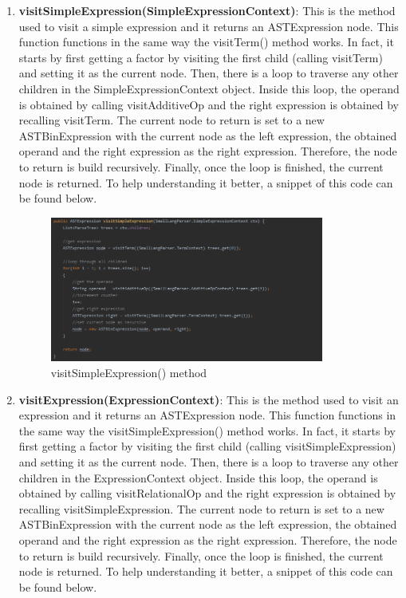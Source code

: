 \documentclass{article}
\begin{document}
\begin{enumerate}
					\item \textbf{visitSimpleExpression(SimpleExpressionContext)}:  This is the method used to visit a simple expression and it returns an ASTExpression node. This function functions in the same way the visitTerm() method works. In fact, it starts by first getting a factor by visiting the first child (calling visitTerm) and setting it as the current node. Then, there is a loop to traverse any other children in the SimpleExpressionContext object. Inside this loop, the operand is obtained by calling visitAdditiveOp and the right expression is obtained by recalling visitTerm. The current node to return is set to a new ASTBinExpression with the current node as the left expression, the obtained operand and the right expression as the right expression. Therefore, the node to return is build recursively. Finally, once the loop is finished, the current node is returned. To help understanding it better, a snippet of this code can be found below.
					
										\begin{figure}[H]
					\centering
			 			\includegraphics[width=0.85\textwidth]{transformerse.png}
			  			\caption{visitSimpleExpression() method}
			  			\label{fig:transformerse}
					\end{figure}
					
					\item \textbf{visitExpression(ExpressionContext)}:  This is the method used to visit an expression and it returns an ASTExpression node. This function functions in the same way the visitSimpleExpression() method works. In fact, it starts by first getting a factor by visiting the first child (calling visitSimpleExpression) and setting it as the current node. Then, there is a loop to traverse any other children in the ExpressionContext object. Inside this loop, the operand is obtained by calling visitRelationalOp and the right expression is obtained by recalling visitSimpleExpression. The current node to return is set to a new ASTBinExpression with the current node as the left expression, the obtained operand and the right expression as the right expression. Therefore, the node to return is build recursively. Finally, once the loop is finished, the current node is returned. To help understanding it better, a snippet of this code can be found below.
					

\end{enumerate}
\end{document}

